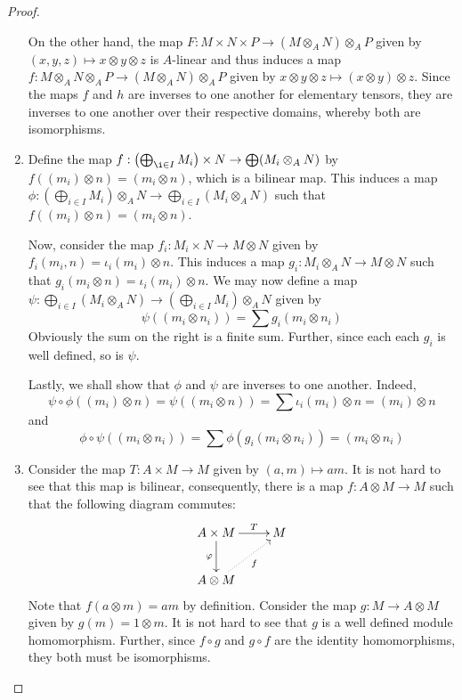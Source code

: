\begin{proof}
\begin{enumerate}[label=(\alph*)]
On the other hand, the map $F: M\times N\times P\to (M\otimes_A N)\otimes_A P$ given by $(x,y,z)\mapsto x\otimes y\otimes z$ is $A$-linear and thus induces a map $f: M\otimes_A N\otimes_A P\to (M\otimes_A N)\otimes_A P$ given by $x\otimes y\otimes z\mapsto(x\otimes y)\otimes z$. Since the maps $f$ and $h$ are inverses to one another for elementary tensors, they are inverses to one another over their respective domains, whereby both are isomorphisms.

\item Define the map $f:\left(\bigoplus_{\i\in I}M_i\right)\times N\to\bigoplus(M_i\otimes_A N)$ by $f((m_i)\otimes n) = (m_i\otimes n)$, which is a bilinear map. This induces a map $\phi:\left(\bigoplus_{i\in I}M_i\right)\otimes_A N\to\bigoplus_{i\in I}(M_i\otimes_A N)$ such that $f((m_i)\otimes n) = (m_i\otimes n)$. 

Now, consider the map $f_i: M_i\times N\to M\otimes N$ given by $f_i(m_i, n) = \iota_i(m_i)\otimes n$. This induces a map $g_i: M_i\otimes_A N\to M\otimes N$ such that $g_i(m_i\otimes n) = \iota_i(m_i)\otimes n$. We may now define a map $\psi:\bigoplus_{i\in I} (M_i\otimes_A N)\to\left(\bigoplus_{i\in I}M_i\right)\otimes_A N$ given by 
\begin{equation*}
    \psi((m_i\otimes n_i)) = \sum g_i(m_i\otimes n_i)
\end{equation*}
Obviously the sum on the right is a finite sum. Further, since each each $g_i$ is well defined, so is $\psi$. 

Lastly, we shall show that $\phi$ and $\psi$ are inverses to one another. Indeed, 
\begin{equation*}
    \psi\circ\phi((m_i)\otimes n) = \psi((m_i\otimes n)) = \sum \iota_i(m_i)\otimes n = (m_i)\otimes n
\end{equation*}
and 
\begin{equation*}
    \phi\circ\psi((m_i\otimes n_i)) = \sum\phi(g_i(m_i\otimes n_i)) = (m_i\otimes n_i)
\end{equation*}

\item Consider the map $T: A\times M\to M$ given by $(a,m)\mapsto am$. It is not hard to see that this map is bilinear, consequently, there is a map $f: A\otimes M\to M$ such that the following diagram commutes: 
\begin{equation*}
\xymatrix {
    A\times M\ar[r]^-T\ar[d]_\varphi & M\\
    A\otimes M\ar@{.>}[ru]_-{f}
}
\end{equation*}
Note that $f(a\otimes m) = am$ by definition. Consider the map $g: M\to A\otimes M$ given by $g(m) = 1\otimes m$. It is not hard to see that $g$ is a well defined module homomorphism. Further, since $f\circ g$ and $g\circ f$ are the identity homomorphisms, they both must be isomorphisms.
\end{enumerate}
\end{proof}

